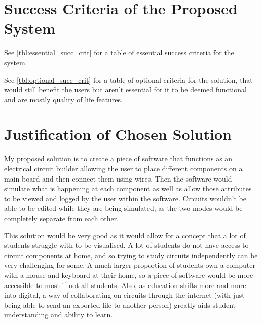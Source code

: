 \section{Success Criteria of the Proposed System}
    See \autoref{tbl:essential_succ_crit} for a table of essential success criteria for the system. 


    See \autoref{tbl:optional_succ_crit} for a table of optional criteria for the solution, that would still benefit the users but aren't essential for it to be deemed functional and are mostly quality of life features.



\section{Justification of Chosen Solution}
    My proposed solution is to create a piece of software that functions as an electrical circuit builder allowing the user to place different components on a main board and then connect them using wires. Then the software would simulate what is happening at each component as well as allow those attributes to be viewed and logged by the user within the software. 
    Circuits wouldn't be able to be edited while they are being simulated, as the two modes would be completely separate from each other.

    This solution would be very good as it would allow for a concept that a lot of students struggle with to be visualised. 
    A lot of students do not have access to circuit components at home, and so trying to study circuits independently can be very challenging for some. 
    A much larger proportion of students own a computer with a mouse and keyboard at their home, so a piece of software would be more accessible to most if not all students. 
    Also, as education shifts more and more into digital, a way of collaborating on circuits through the internet (with just being able to send an exported file to another person) greatly aids student understanding and ability to learn.

